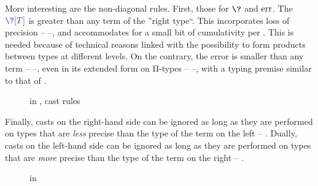 More interesting are the non-diagonal rules.
First, those for $\?$ and $\err$. The  $\tcol{\?[T]}$
is greater than any term of the ”right type“.
This incorporates loss of precision –  –,
and accommodates for a small bit of cumulativity per .
This is needed because of technical reasons linked with the possibility
to form products between types at different levels.
On the contrary, the error is smaller than any term –  –,
even in its extended form on Π-types –  –,
with a typing premise similar to that of .

\begin{figure*}[ht]
  \ContinuedFloat
  \caption{ in , cast rules}
  \label{fig:apre-cast}
\end{figure*}

Finally, casts on the right-hand side can be ignored as long as they
are performed on types that are \emph{less} precise than the type of the
term on the left – . Dually, casts on the
left-hand side can be ignored as long as they are performed on types
that are \emph{more} precise than the type of the term on the right
– .

\begin{figure*}[ht]
  \ContinuedFloat
  \caption{ in }
  \label{fig:dpre}
\end{figure*}

